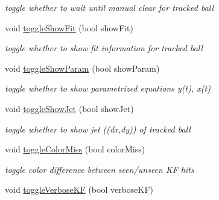 \begin{DoxyCompactItemize}
\begin{DoxyCompactList}\small\item\em toggle whether to wait until manual clear for tracked ball \end{DoxyCompactList}\item 
void \hyperlink{classProjectorWindow_a78200036bc00ffc3174f56b86cb579b6}{toggle\+Show\+Fit} (bool show\+Fit)\hypertarget{classProjectorWindow_a78200036bc00ffc3174f56b86cb579b6}{}\label{classProjectorWindow_a78200036bc00ffc3174f56b86cb579b6}

\begin{DoxyCompactList}\small\item\em toggle whether to show fit information for tracked ball \end{DoxyCompactList}\item 
void \hyperlink{classProjectorWindow_a2107db03354afdbe8067c58dc272379e}{toggle\+Show\+Param} (bool show\+Param)\hypertarget{classProjectorWindow_a2107db03354afdbe8067c58dc272379e}{}\label{classProjectorWindow_a2107db03354afdbe8067c58dc272379e}

\begin{DoxyCompactList}\small\item\em toggle whether to show parametrized equations y(t), x(t) \end{DoxyCompactList}\item 
void \hyperlink{classProjectorWindow_ad8a865fc811bd79cea1e8b15922b1bd5}{toggle\+Show\+Jet} (bool show\+Jet)\hypertarget{classProjectorWindow_ad8a865fc811bd79cea1e8b15922b1bd5}{}\label{classProjectorWindow_ad8a865fc811bd79cea1e8b15922b1bd5}

\begin{DoxyCompactList}\small\item\em toggle whether to show jet ((dx,dy)) of tracked ball \end{DoxyCompactList}\item 
void \hyperlink{classProjectorWindow_a6ba6eddab7165b862195c35c60207e93}{toggle\+Color\+Miss} (bool color\+Miss)\hypertarget{classProjectorWindow_a6ba6eddab7165b862195c35c60207e93}{}\label{classProjectorWindow_a6ba6eddab7165b862195c35c60207e93}

\begin{DoxyCompactList}\small\item\em toggle color difference between seen/unseen KF hits \end{DoxyCompactList}\item 
void \hyperlink{classProjectorWindow_ad8c1fa92c00d2541d2a85ac06e99b658}{toggle\+Verbose\+KF} (bool verbose\+KF)\hypertarget{classProjectorWindow_ad8c1fa92c00d2541d2a85ac06e99b658}{}\label{classProjectorWindow_ad8c1fa92c00d2541d2a85ac06e99b658}


\end{DoxyCompactItemize}
